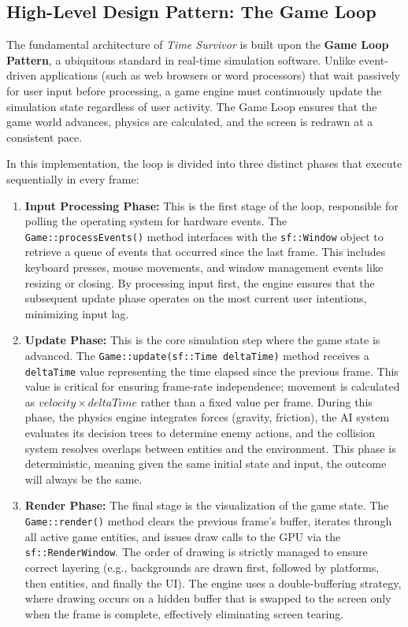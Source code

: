 \documentclass[10pt, a4paper]{article}
\begin{document}
\subsection{High-Level Design Pattern: The Game Loop}
The fundamental architecture of \textit{Time Survivor} is built upon the \textbf{Game Loop Pattern}, a ubiquitous standard in real-time simulation software. Unlike event-driven applications (such as web browsers or word processors) that wait passively for user input before processing, a game engine must continuously update the simulation state regardless of user activity. The Game Loop ensures that the game world advances, physics are calculated, and the screen is redrawn at a consistent pace.

In this implementation, the loop is divided into three distinct phases that execute sequentially in every frame:

\begin{enumerate}
    \item \textbf{Input Processing Phase:} This is the first stage of the loop, responsible for polling the operating system for hardware events. The \texttt{Game::processEvents()} method interfaces with the \texttt{sf::Window} object to retrieve a queue of events that occurred since the last frame. This includes keyboard presses, mouse movements, and window management events like resizing or closing. By processing input first, the engine ensures that the subsequent update phase operates on the most current user intentions, minimizing input lag. 
    
    \item \textbf{Update Phase:} This is the core simulation step where the game state is advanced. The \texttt{Game::update(sf::Time deltaTime)} method receives a \texttt{deltaTime} value representing the time elapsed since the previous frame. This value is critical for ensuring frame-rate independence; movement is calculated as $velocity \times deltaTime$ rather than a fixed value per frame. During this phase, the physics engine integrates forces (gravity, friction), the AI system evaluates its decision trees to determine enemy actions, and the collision system resolves overlaps between entities and the environment. This phase is deterministic, meaning given the same initial state and input, the outcome will always be the same.
    
    \item \textbf{Render Phase:} The final stage is the visualization of the game state. The \texttt{Game::render()} method clears the previous frame's buffer, iterates through all active game entities, and issues draw calls to the GPU via the \texttt{sf::RenderWindow}. The order of drawing is strictly managed to ensure correct layering (e.g., backgrounds are drawn first, followed by platforms, then entities, and finally the UI). The engine uses a double-buffering strategy, where drawing occurs on a hidden buffer that is swapped to the screen only when the frame is complete, effectively eliminating screen tearing.
\end{enumerate}
\end{document}
